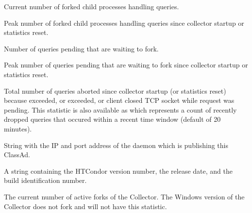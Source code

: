 \begin{description}

\item[\AdAttr{ActiveQueryWorkers}:] Current number of forked child processes handling 
	queries.

\item[\AdAttr{ActiveQueryWorkersPeak}:] Peak number of forked child processes handling 
	queries since collector startup or statistics reset.

\item[\AdAttr{PendingQueries}:] Number of queries pending that are waiting
	to fork.

\item[\AdAttr{PendingQueriesPeak}:] Peak number of queries pending that are waiting
	to fork since collector startup or statistics reset.

\item[\AdAttr{DroppedQueries}:] 
  Total number of queries aborted since collector startup (or statistics reset) because
   exceeded, or
   exceeded, or client closed TCP socket while
  request was pending. This statistic is also available as 
  which represents a count of recently dropped queries that occured within a recent time 
  window (default of 20 minutes).

\item[\AdAttr{CollectorIpAddr}:] String with the IP and port address of the
   daemon which is publishing this ClassAd.

\item[\AdAttr{CondorVersion}:] A string containing the HTCondor version
number, the release date, and the build identification number.

\item[\AdAttr{CondorVersion}:] The current number of active forks of the Collector.
The Windows version of the Collector does not fork and will not have this statistic.


\end{description}
